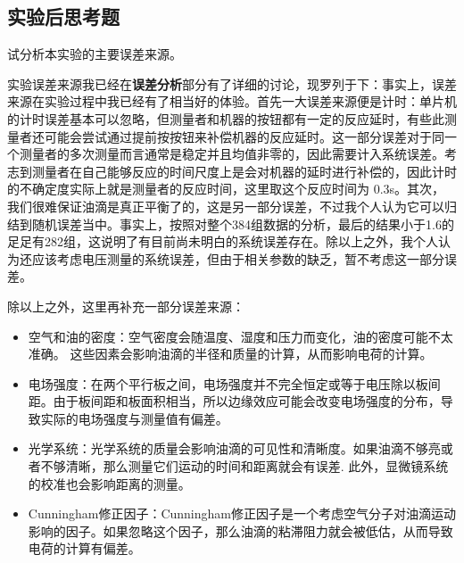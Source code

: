 \documentclass[dvipsnames, svgnames,a4paper,11pt]{article}
\begin{document}
	\clearpage
	\subsection{实验后思考题}
	\begin{question}
		试分析本实验的主要误差来源。
	\end{question}
	实验误差来源我已经在\textbf{误差分析}部分有了详细的讨论，现罗列于下：事实上，误差来源在实验过程中我已经有了相当好的体验。首先一大误差来源便是计时：单片机的计时误差基本可以忽略，但测量者和机器的按钮都有一定的反应延时，有些此测量者还可能会尝试通过提前按按钮来补偿机器的反应延时。这一部分误差对于同一个测量者的多次测量而言通常是稳定并且均值非零的，因此需要计入系统误差。考志到测量者在自己能够反应的时间尺度上是会对机器的延时进行补偿的，因此计时的不确定度实际上就是测量者的反应时间，这里取这个反应时间为 0.3s。其次，我们很难保证油滴是真正平衡了的，这是另一部分误差，不过我个人认为它可以归结到随机误差当中。事实上，按照对整个384组数据的分析，最后的结果小于1.6的足足有282组，这说明了有目前尚未明白的系统误差存在。除以上之外，我个人认为还应该考虑电压测量的系统误差，但由于相关参数的缺乏，暂不考虑这一部分误差。
	
	除以上之外，这里再补充一部分误差来源：
	\begin{itemize}
		\item 空气和油的密度：空气密度会随温度、湿度和压力而变化，油的密度可能不太准确。 这些因素会影响油滴的半径和质量的计算，从而影响电荷的计算。
		
		\item 电场强度：在两个平行板之间，电场强度并不完全恒定或等于电压除以板间距。由于板间距和板面积相当，所以边缘效应可能会改变电场强度的分布，导致实际的电场强度与测量值有偏差。
		
		\item 光学系统：光学系统的质量会影响油滴的可见性和清晰度。如果油滴不够亮或者不够清晰，那么测量它们运动的时间和距离就会有误差. 此外，显微镜系统的校准也会影响距离的测量。
		
		\item Cunningham修正因子：Cunningham修正因子是一个考虑空气分子对油滴运动影响的因子。如果忽略这个因子，那么油滴的粘滞阻力就会被低估，从而导致电荷的计算有偏差。
	\end{itemize}
		
\end{document}
